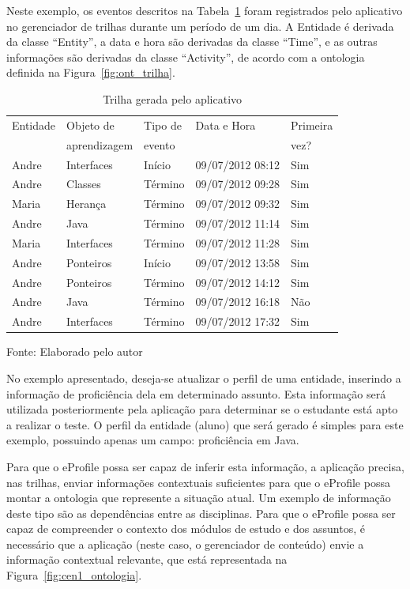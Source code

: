 Neste exemplo, os eventos descritos na Tabela~\ref{tab:eventos} foram registrados pelo aplicativo no gerenciador de trilhas durante um período de um dia. A Entidade é derivada da classe ``Entity'', a data e hora são derivadas da classe ``Time'', e as outras informações são derivadas da classe ``Activity'', de acordo com a ontologia definida na Figura~\ref{fig:ont_trilha}.

\begin{table}\centering\footnotesize
  \caption{Trilha gerada pelo aplicativo}
  \begin{tabular*}{0.65\textwidth}{@{}lllll@{}}
    \toprule
    Entidade & Objeto de    & Tipo de & Data e Hora & Primeira \\
             & aprendizagem & evento  &             & vez? \\
    \midrule
    Andre    & Interfaces   & Início  & 09/07/2012 08:12 & Sim \\
    Andre    & Classes      & Término & 09/07/2012 09:28 & Sim \\
    Maria    & Herança      & Término & 09/07/2012 09:32 & Sim \\
    Andre    & Java         & Término & 09/07/2012 11:14 & Sim \\
    Maria    & Interfaces   & Término & 09/07/2012 11:28 & Sim \\
    Andre    & Ponteiros    & Início  & 09/07/2012 13:58 & Sim \\
    Andre    & Ponteiros    & Término & 09/07/2012 14:12 & Sim \\
    Andre    & Java         & Término & 09/07/2012 16:18 & Não \\
    Andre    & Interfaces   & Término & 09/07/2012 17:32 & Sim \\
    \bottomrule
  \end{tabular*}
  \label{tab:eventos}
  
Fonte: Elaborado pelo autor
\end{table}

No exemplo apresentado, deseja-se atualizar o perfil de uma entidade, inserindo a informação de proficiência dela em determinado assunto. Esta informação será utilizada posteriormente pela aplicação para determinar se o estudante está apto a realizar o teste. O perfil da entidade (aluno) que será gerado é simples para este exemplo, possuindo apenas um campo: proficiência em Java.

Para que o eProfile possa ser capaz de inferir esta informação, a aplicação precisa, nas trilhas, enviar informações contextuais suficientes para que o eProfile possa montar a ontologia que represente a situação atual. Um exemplo de informação deste tipo são as dependências entre as disciplinas. Para que o eProfile possa ser capaz de compreender o contexto dos módulos de estudo e dos assuntos, é necessário que a aplicação (neste caso, o gerenciador de conteúdo) envie a informação contextual relevante, que está representada na Figura~\ref{fig:cen1_ontologia}.

